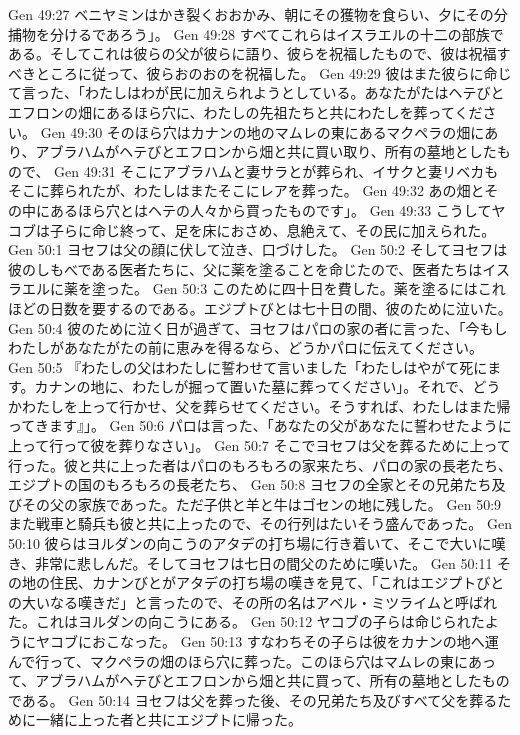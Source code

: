 Gen 49:27  ベニヤミンはかき裂くおおかみ、朝にその獲物を食らい、夕にその分捕物を分けるであろう」。
Gen 49:28  すべてこれらはイスラエルの十二の部族である。そしてこれは彼らの父が彼らに語り、彼らを祝福したもので、彼は祝福すべきところに従って、彼らおのおのを祝福した。
Gen 49:29  彼はまた彼らに命じて言った、「わたしはわが民に加えられようとしている。あなたがたはヘテびとエフロンの畑にあるほら穴に、わたしの先祖たちと共にわたしを葬ってください。
Gen 49:30  そのほら穴はカナンの地のマムレの東にあるマクペラの畑にあり、アブラハムがヘテびとエフロンから畑と共に買い取り、所有の墓地としたもので、
Gen 49:31  そこにアブラハムと妻サラとが葬られ、イサクと妻リベカもそこに葬られたが、わたしはまたそこにレアを葬った。
Gen 49:32  あの畑とその中にあるほら穴とはヘテの人々から買ったものです」。
Gen 49:33  こうしてヤコブは子らに命じ終って、足を床におさめ、息絶えて、その民に加えられた。
Gen 50:1  ヨセフは父の顔に伏して泣き、口づけした。
Gen 50:2  そしてヨセフは彼のしもべである医者たちに、父に薬を塗ることを命じたので、医者たちはイスラエルに薬を塗った。
Gen 50:3  このために四十日を費した。薬を塗るにはこれほどの日数を要するのである。エジプトびとは七十日の間、彼のために泣いた。
Gen 50:4  彼のために泣く日が過ぎて、ヨセフはパロの家の者に言った、「今もしわたしがあなたがたの前に恵みを得るなら、どうかパロに伝えてください。
Gen 50:5  『わたしの父はわたしに誓わせて言いました「わたしはやがて死にます。カナンの地に、わたしが掘って置いた墓に葬ってください」。それで、どうかわたしを上って行かせ、父を葬らせてください。そうすれば、わたしはまた帰ってきます』」。
Gen 50:6  パロは言った、「あなたの父があなたに誓わせたように上って行って彼を葬りなさい」。
Gen 50:7  そこでヨセフは父を葬るために上って行った。彼と共に上った者はパロのもろもろの家来たち、パロの家の長老たち、エジプトの国のもろもろの長老たち、
Gen 50:8  ヨセフの全家とその兄弟たち及びその父の家族であった。ただ子供と羊と牛はゴセンの地に残した。
Gen 50:9  また戦車と騎兵も彼と共に上ったので、その行列はたいそう盛んであった。
Gen 50:10  彼らはヨルダンの向こうのアタデの打ち場に行き着いて、そこで大いに嘆き、非常に悲しんだ。そしてヨセフは七日の間父のために嘆いた。
Gen 50:11  その地の住民、カナンびとがアタデの打ち場の嘆きを見て、「これはエジプトびとの大いなる嘆きだ」と言ったので、その所の名はアベル・ミツライムと呼ばれた。これはヨルダンの向こうにある。
Gen 50:12  ヤコブの子らは命じられたようにヤコブにおこなった。
Gen 50:13  すなわちその子らは彼をカナンの地へ運んで行って、マクペラの畑のほら穴に葬った。このほら穴はマムレの東にあって、アブラハムがヘテびとエフロンから畑と共に買って、所有の墓地としたものである。
Gen 50:14  ヨセフは父を葬った後、その兄弟たち及びすべて父を葬るために一緒に上った者と共にエジプトに帰った。
